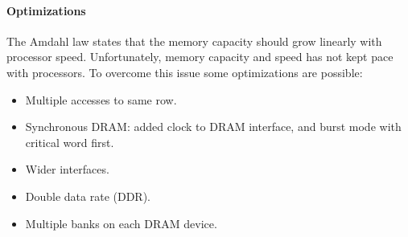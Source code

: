 \paragraph*{Optimizations}
The Amdahl law states that the memory capacity should grow linearly with processor speed. 
Unfortunately, memory capacity and speed has not kept pace with processors. 
To overcome this issue some optimizations are possible: 
\begin{itemize}
    \item Multiple accesses to same row. 
    \item Synchronous DRAM: added clock to DRAM interface, and burst mode with critical word first.
    \item Wider interfaces.
    \item Double data rate (DDR).
    \item Multiple banks on each DRAM device.
\end{itemize}